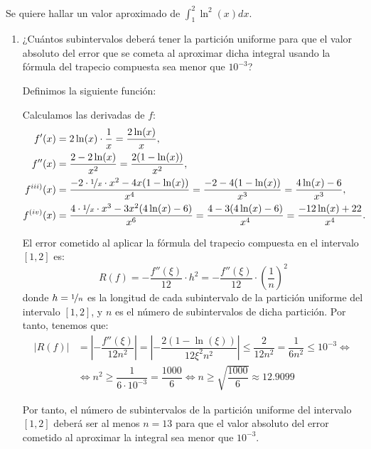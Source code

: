 \begin{ejercicio}\label{ej:2.1.20}
    Se quiere hallar un valor aproximado de $\int_{1}^{2} \ln^2(x) dx$.
    \begin{enumerate}
        \item ¿Cuántos subintervalos deberá tener la partición uniforme para que el valor absoluto del error que se cometa al aproximar dicha integral usando la fórmula del trapecio compuesta sea menor que $10^{-3}$?
        
        Definimos la siguiente función:

        Calculamos las derivadas de $f$:
        \begin{align*}
            f'(x) &= 2\ln(x)\cdot \frac{1}{x} = \frac{2\ln(x)}{x},\\
            f''(x) &= \frac{2-2\ln(x)}{x^2} = \frac{2(1 - \ln(x))}{x^2},\\
            f^{iii)}(x) &= \dfrac{-2\cdot \nicefrac{1}{x}\cdot x^2 - 4x(1 - \ln(x))}{x^4} = \dfrac{-2 - 4(1 - \ln(x))}{x^3}
            = \dfrac{4\ln(x) - 6}{x^3},\\
            f^{(iv)}(x) &= \dfrac{4\cdot \nicefrac{1}{x}\cdot x^3 - 3x^2(4\ln(x) - 6)}{x^6} = \dfrac{4 - 3(4\ln(x) - 6)}{x^4}
            = \dfrac{-12\ln(x) + 22}{x^4}.
        \end{align*}

        El error cometido al aplicar la fórmula del trapecio compuesta en el intervalo $[1, 2]$ es:
        \begin{equation*}
            R(f) = -\dfrac{f''(\xi)}{12} \cdot h^2
            = -\dfrac{f''(\xi)}{12} \cdot \left(\dfrac{1}{n}\right)^2
        \end{equation*}
        donde $h = \nicefrac{1}{n}$ es la longitud de cada subintervalo de la partición uniforme del intervalo $[1, 2]$, y $n$ es el número de subintervalos de dicha partición.
        Por tanto, tenemos que:
        \begin{align*}
            |R(f)| &= \left| -\dfrac{f''(\xi)}{12n^2} \right| = \left| -\dfrac{2(1 - \ln(\xi))}{12\xi^2n^2} \right| \leq \dfrac{2}{12n^2} = \dfrac{1}{6n^2}\leq 10^{-3}\iff \\&\iff n^2 \geq \dfrac{1}{6\cdot 10^{-3}} = \dfrac{1000}{6} \iff n \geq \sqrt{\dfrac{1000}{6}} \approx 12.9099
        \end{align*}

        Por tanto, el número de subintervalos de la partición uniforme del intervalo $[1, 2]$ deberá ser al menos $n = 13$ para que el valor absoluto del error cometido al aproximar la integral sea menor que $10^{-3}$.


\end{enumerate}
\end{ejercicio}
